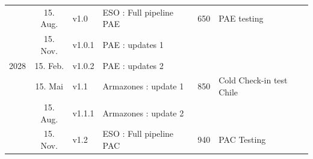 \documentclass[a4paper]{spie}  %
\begin{document}
\begin{table}[]
\begin{tabular}{|lcllll|}
                                  & 15. Aug.      & v1.0             & ESO : Full pipeline PAE         & {650}                & PAE testing                          \\
                                  & 15. Nov.      & v1.0.1           & PAE : updates 1              &                                        &                                      \\
\hline
{2028}          & 15. Feb.      & v1.0.2           & PAE : updates 2               &                                        &                                      \\
                                  & 15. Mai       & v1.1             & Armazones : update 1           & {850}                & Cold Check-in test Chile             \\
                                  & 15. Aug.      & v1.1.1           &Armazones : update 2          &                                        &                                      \\
                                  & 15. Nov.      & v1.2             & ESO : Full pipeline PAC         & {940}                & PAC Testing       \\         
\hline
\end{tabular}
\end{table}
\end{document}
